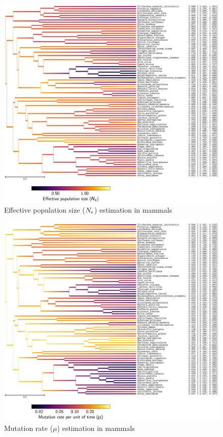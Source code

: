\documentclass{article}
\begin{document}
	\begin{figure}[H]
		\centering
		\includegraphics[width=\linewidth, page=1]{mammals/18CDS_SiteMutSelBranchNe_R1_LogPopulationSize}
		\caption[$\Ne$ estimation in mammals]{Effective population size ($\Ne$) estimation in mammals}
	\end{figure}

	\begin{figure}[H]
		\centering
		\includegraphics[width=\linewidth, page=1]{mammals/18CDS_SiteMutSelBranchNe_R1_LogMutationRatePerTime}
		\caption[Mutation rate estimation in mammals]{Mutation rate ($\mu$) estimation in mammals}
	\end{figure}
\end{document}
